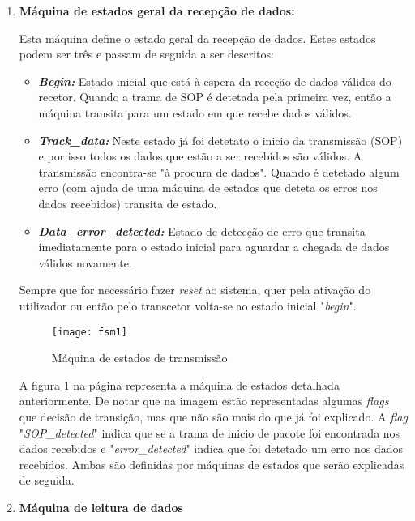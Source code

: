 \begin{enumerate}
	\item \textbf{Máquina de estados geral da recepção de dados:}
	
	Esta máquina define o estado geral da recepção de dados. Estes estados podem ser três e passam de seguida a ser descritos:
	\begin{itemize}
		\item \textbf{\textit{Begin:}} Estado inicial que está à espera da receção de dados válidos do recetor. Quando a trama de SOP é detetada pela primeira vez, então a máquina transita para um estado em que recebe dados válidos. 
		\item \textbf{\textit{Track\_data:}} Neste estado já foi detetato o inicio da transmissão (SOP) e por isso todos os dados que estão a ser recebidos são válidos. A transmissão encontra-se "à procura de dados". Quando é detetado algum erro (com ajuda de uma máquina de estados que deteta os erros nos dados recebidos) transita de estado.
		\item \textbf{\textit{Data\_error\_detected:} }Estado de detecção de erro que transita imediatamente para o estado inicial para aguardar a chegada de dados válidos novamente.
	\end{itemize}

	Sempre que for necessário fazer \textit{reset} ao sistema, quer pela ativação do utilizador ou então pelo transcetor volta-se ao estado inicial "\textit{begin}".
	
	
	\begin{figure}[h!]
		\begin{center}
			\leavevmode
			\texttt{[image: fsm1]}
			\captionsetup{width=1.0\linewidth}
			\caption[Máquina de estados de transmissão]{Máquina de estados de transmissão}
			\label{fig:FSM1}
	\end{center}
	\end{figure}
	
	A figura \ref{fig:FSM1} na página \pageref{fig:FSM1} representa a máquina de estados detalhada anteriormente. De notar que na imagem estão representadas algumas \textit{flags} que decisão de transição, mas que não são mais do que já foi explicado. A \textit{flag} "\textit{SOP\_detected}" indica que se a trama de inicio de pacote foi encontrada nos dados recebidos e "\textit{error\_detected}" indica que foi detetado um erro nos dados recebidos. Ambas são definidas por máquinas de estados que serão explicadas de seguida.
	
	
	\item \textbf{Máquina de leitura de dados}
	 

\end{enumerate}
